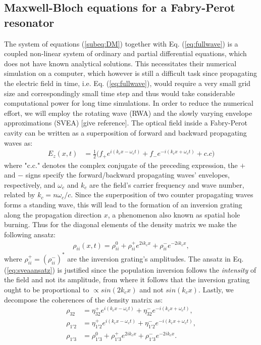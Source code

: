 \documentclass[10pt,letterpaper]{article}
\begin{document}
\subsection{Maxwell-Bloch equations for a Fabry-Perot resonator} 
The system of equations  (\ref{subeq:DM}) together with Eq. (\ref{eq:fullwave}) is a coupled non-linear system of ordinary and partial differential equations, which does not have known analytical solutions. This necessitates their numerical simulation on a computer, which however is still a difficult task since propagating the electric field in time, i.e. Eq. (\ref{eq:fullwave}), would require a very small grid size and correspondingly small time step and thus would take considerable computational power for long time simulations. In order to reduce the numerical effort, we will employ the rotating wave (RWA) and the slowly varying envelope approximations (SVEA) [give reference]. The optical field inside a Fabry-Perot cavity can be written as a superposition of forward and backward propagating waves as: 
\begin{align}
	E_z(x,t) &= \frac{1}{2} \big ( f_{+} e^{i(k_c x-\omega_c t)} + f_{-} e^{-i(k_c x+\omega_c t)} + c.c \big )\label{eq:sveaefield}
\end{align}
where "c.c." denotes the complex conjugate of the preceding expression, the $+$ and $-$ signs specify the forward/backward propagating waves' envelopes, respectively, and $\omega_c$  and $k_c$ are the field's  carrier frequency and wave number, related by $k_c = n \omega_c  / c$. Since the superposition of two counter propagating waves forms a standing wave, this will lead to the formation of an inversion grating along the propagation direction $x$, a phenomenon also known as spatial hole burning. Thus for the diagonal elements of the density matrix we make the following ansatz:
\begin{align}
      \rho_{ii}(x,t) = \rho_{ii}^0 + \rho_{ii}^+ e^{2ik_c x} + \rho_{ii}^-e^{-2ik_c x}, \label{eq:sveaansatz}
\end{align}
where $\rho_{ii}^+ = (\rho_{ii}^-)^*$ are the inversion grating's amplitudes. The ansatz in Eq. (\ref{eq:sveaansatz}) is justified since the population inversion follows the \emph{intensity} of the field and not its amplitude, from where it follows that the inversion grating ought to be proportional to $\propto sin(2k_cx)$ and not $sin(k_c x)$. Lastly, we decompose the coherences of the density matrix as:
\begin{align}
   \rho_{32} &= \eta_{32}^{+}e^{i(k_cx-\omega_ct)} + \eta_{32}^{-}e^{-i(k_c x+\omega_c t)}, \nonumber \\
   \rho_{1'2} &= \eta_{1'2}^{+}e^{i(k_c x - \omega_c t)} + \eta_{1'2}^{-}e^{-i(k_c x+\omega_c t)}, \nonumber \\
   \rho_{1'3} &= \rho_{1'3}^0 + \rho_{1'3}^{+} e^{2ik_cx} +  \rho_{1'3}^{-} e^{-2ik_cx}.   \label{eq:sveacoherences}
\end{align}
\end{document}
